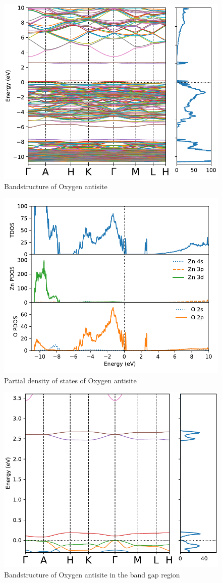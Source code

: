 \begin{figure}[tbh!]
	\centering
	\includegraphics[width=0.6\linewidth]{"images/rnd/band-dos_O_anti"}
	\caption[Bandstructure of Oxygen antisite]{Bandstructure of Oxygen antisite}
	\label{fig:band-dos_O_anti}
\end{figure}

\begin{figure}[tbh!]
	\centering
	\includegraphics[width=0.6\linewidth]{"images/rnd/dos-pdos_O_anti"}
	\caption[Partial density of states of Oxygen antisite]{Partial density of states of Oxygen antisite}
	\label{fig:dos-pdos_O_anti}
\end{figure}

\begin{figure}[tbh!]
	\centering
	\includegraphics[width=0.6\linewidth]{"images/rnd/band-dos-close_O_anti"}
	\caption[Bandstructure of Oxygen antisite in the band gap region]{Bandstructure of Oxygen antisite  in the band gap region}
	\label{fig:band-dos-close_O_anti}
\end{figure}
\clearpage

